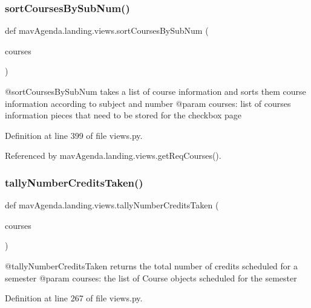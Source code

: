 \subsubsection{\texorpdfstring{sort\+Courses\+By\+Sub\+Num()}{sortCoursesBySubNum()}}
{\footnotesize\ttfamily def mav\+Agenda.\+landing.\+views.\+sort\+Courses\+By\+Sub\+Num (\begin{DoxyParamCaption}\item[{}]{courses }\end{DoxyParamCaption})}

\begin{DoxyVerb}@sortCoursesBySubNum takes a list of course information and sorts them course information according to subject and number
@param courses: list of courses information pieces that need to be stored for the checkbox page
\end{DoxyVerb}
 

Definition at line 399 of file views.\+py.



Referenced by mav\+Agenda.\+landing.\+views.\+get\+Req\+Courses().

\mbox{\label{namespacemavAgenda_1_1landing_1_1views_a10751be31a0b978bcd8769ac78b55b8a}} 
\subsubsection{\texorpdfstring{tally\+Number\+Credits\+Taken()}{tallyNumberCreditsTaken()}}
{\footnotesize\ttfamily def mav\+Agenda.\+landing.\+views.\+tally\+Number\+Credits\+Taken (\begin{DoxyParamCaption}\item[{}]{courses }\end{DoxyParamCaption})}

\begin{DoxyVerb}@tallyNumberCreditsTaken returns the total number of credits scheduled for a semester
@param courses: the list of Course objects scheduled for the semester
\end{DoxyVerb}
 

Definition at line 267 of file views.\+py.



